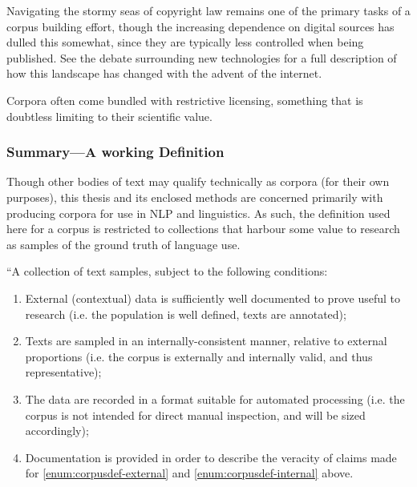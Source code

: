 Navigating the stormy seas of copyright law remains one of the primary tasks of a corpus building effort, though the increasing dependence on digital sources has dulled this somewhat, since they are typically less controlled when being published.  See the debate surrounding new technologies for a full description of how this landscape has changed with the advent of the internet.

Corpora often come bundled with restrictive licensing, something that is doubtless limiting to their scientific value.  %



\subsubsection{Summary---A working Definition}
Though other bodies of text may qualify technically as corpora (for their own purposes), this thesis and its enclosed methods are concerned primarily with producing corpora for use in NLP and linguistics.  As such, the definition used here for a corpus is restricted to collections that harbour some value to research as samples of the ground truth of language use.

``A collection of text samples, subject to the following conditions:

\begin{enumerate}
    \item \label{enum:corpusdef-external} External (contextual) data is sufficiently well documented to prove useful to research (i.e. the population is well defined, texts are annotated);
    \item \label{enum:corpusdef-internal} Texts are sampled in an internally-consistent manner, relative to external proportions (i.e. the corpus is externally and internally valid, and thus representative);
    \item The data are recorded in a format suitable for automated processing (i.e. the corpus is not intended for direct manual inspection, and will be sized accordingly);
    \item Documentation is provided in order to describe the veracity of claims made for \ref{enum:corpusdef-external} and \ref{enum:corpusdef-internal} above.
\end{enumerate}

